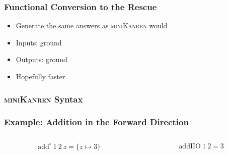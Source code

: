 \documentclass[xcolor=table, aspectratio=169]{beamer}
\newcommand{\mk}{\textsc{miniKanren}\xspace}
\begin{document}
\begin{frame}[fragile]
  \frametitle{Functional Conversion to the Rescue}
\begin{center}
  
\end{center}

\vfill

\begin{center}
  \begin{minipage}{0.4\textwidth}
    \begin{itemize}
      \item Generate the same answers as \mk would
      \item Inputs: ground 
      \item Outputs: ground 
      \item Hopefully faster
    \end{itemize}
  \end{minipage}
\end{center}
\end{frame}

\begin{frame}[fragile]
  \frametitle{\mk Syntax}
\begin{center}
  
\end{center}
\end{frame}

\begin{frame}[fragile]
  \frametitle{Example: Addition in the Forward Direction}
\begin{columns}
  \begin{column}[t]{0.49\textwidth}
    
    \[ \text{add}^{\circ}\ 1\ 2\ z = \{z \mapsto 3\}\]
  \end{column}
  \begin{column}[t]{0.49\textwidth}
    
    \[ \text{addIIO}\ 1\ 2 = 3 \] 
  \end{column}
\end{columns}
\end{frame}

\end{document}
